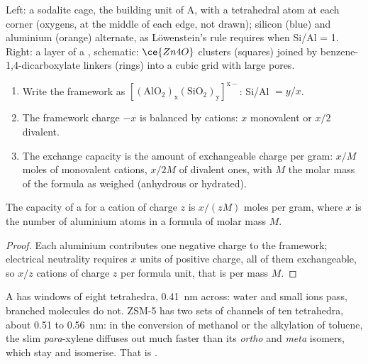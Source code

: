 \begin{omfigure}
{\small Left: a sodalite cage, the building unit of  A, with a
tetrahedral atom at each corner (oxygens, at the middle of each edge, not
drawn); silicon (blue) and aluminium (orange) alternate, as Löwenstein's rule
requires when Si/Al = 1. Right: a layer of a ,
schematic: $\ce{Zn4O}$ clusters (squares) joined by benzene-1,4-dicarboxylate
linkers (rings) into a cubic grid with large pores.}
\end{omfigure}

\begin{method}\label{met:b3:inorganic-materials:zeolite-formula}
\begin{enumerate}
  \item Write the framework as $\mathrm{[(AlO_2)_x(SiO_2)_y]^{x-}}$: Si/Al $= y/x$.
  \item The framework charge $-x$ is balanced by cations: $x$ monovalent or $x/2$
        divalent.
  \item The exchange capacity is the amount of exchangeable charge per gram:
        $x/M$ moles of monovalent cations, $x/2M$ of divalent ones, with $M$ the
        molar mass of the formula as weighed (anhydrous or hydrated).
\end{enumerate}
\end{method}

\begin{proposition}\label{prop:b3:inorganic-materials:exchange-capacity}
The capacity of a  for a cation of charge $z$ is $x/(zM)$ moles per gram,
where $x$ is the number of aluminium atoms in a formula of molar mass $M$.
\end{proposition}

\begin{proof}
Each aluminium contributes one negative charge to the framework; electrical
neutrality requires $x$ units of positive charge, all of them exchangeable, so
$x/z$ cations of charge $z$ per formula unit, that is per mass $M$.
\end{proof}

 A has windows of eight tetrahedra, \qty{0.41}{nm} across: water and small
ions pass, branched molecules do not. ZSM-5 has two sets of channels of ten
tetrahedra, about 0.51 to \qty{0.56}{nm}: in the conversion of methanol or the
alkylation of toluene, the slim \textit{para}-xylene diffuses out much faster than
its \textit{ortho} and \textit{meta} isomers, which stay and isomerise. That is .

